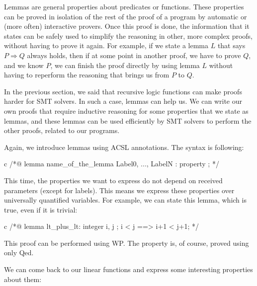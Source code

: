 Lemmas are general properties about predicates or functions. These properties
can be proved in isolation of the rest of the proof of a program by automatic or
(more often) interactive provers. Once this proof is done, the information that
it states can be safely used to simplify the reasoning in other, more complex
proofs, without having to prove it again. For example, if we state a lemma $L$
that says $P \Rightarrow Q$ always holds, then if at some point in another proof, we
have to prove $Q$, and we know $P$, we can finish the proof directly by using lemma
$L$ without having to reperform the reasoning that brings us from $P$ to
$Q$.


In the previous section, we said that recursive logic functions can make proofs harder
for SMT solvers. In such a case, lemmas can help us. We can write our own
proofs that require inductive reasoning for some properties that we state as
lemmas, and these lemmas can be used efficiently by SMT solvers to perform the
other proofs, related to our programs.




Again, we introduce lemmas using ACSL annotations. The syntax is
following:



\begin{CodeBlock}{c}
/*@
  lemma name_of_the_lemma { Label0, ..., LabelN }:
    property ;
*/
\end{CodeBlock}



This time, the properties we want to express do not depend on received
parameters (except for labels). This means we express these properties over universally
quantified variables. For example, we can state this lemma, which is true, even
if it is trivial:



\begin{CodeBlock}{c}
/*@
  lemma lt_plus_lt:
    \forall integer i, j ; i < j ==> i+1 < j+1;
*/
\end{CodeBlock}



This proof can be performed using WP. The property is, of course, proved
using only Qed.





We can come back to our linear functions and express some interesting
properties about them:



